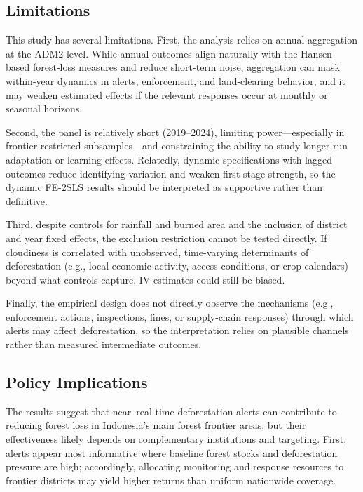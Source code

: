 \documentclass[hidelinks,12pt]{article}
\begin{document}
\subsection{Limitations}
\label{sec:discussion_limitations}

This study has several limitations. First, the analysis relies on annual aggregation at the ADM2 level. While annual outcomes align naturally with the Hansen-based forest-loss measures and reduce short-term noise, aggregation can mask within-year dynamics in alerts, enforcement, and land-clearing behavior, and it may weaken  estimated effects if the relevant responses occur at monthly or seasonal horizons. 

Second, the panel is relatively short (2019--2024), limiting power—especially in frontier-restricted subsamples—and constraining the ability to study longer-run adaptation or learning effects. Relatedly, dynamic specifications with lagged outcomes reduce identifying variation and weaken first-stage strength, so the dynamic FE-2SLS results should be interpreted as supportive rather than definitive.
 
Third, despite controls for rainfall and burned area and the inclusion of district and year fixed effects, the exclusion restriction cannot be tested directly. If cloudiness is correlated with unobserved, time-varying determinants of deforestation (e.g., local economic activity, access conditions, or crop calendars) beyond what controls capture, IV estimates could still be biased. 

Finally, the empirical design does not directly observe the mechanisms (e.g., enforcement actions, inspections, fines, or supply-chain responses) through which alerts may affect deforestation, so the interpretation relies on plausible channels rather than measured intermediate outcomes.


\subsection{Policy Implications}
\label{sec:discussion_policy}

The results suggest that near--real-time deforestation alerts can contribute to reducing forest loss in Indonesia's main forest frontier areas, but their effectiveness likely depends on complementary institutions and targeting. First, alerts appear most informative where baseline forest stocks and deforestation pressure are high; accordingly, allocating monitoring and response resources to frontier districts may yield higher returns than uniform nationwide coverage. \citep{assuncao2023optimal}
\end{document}
